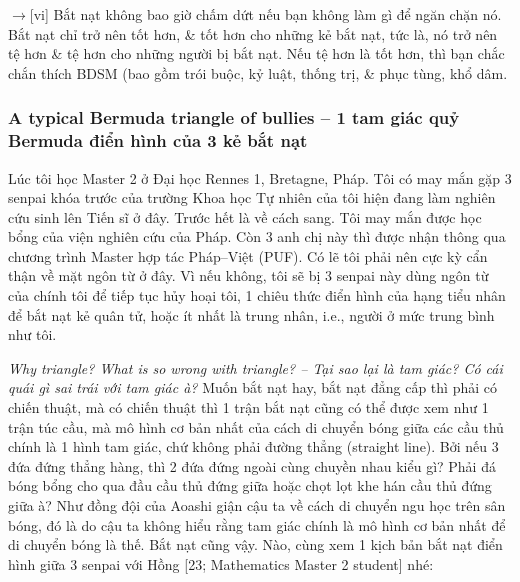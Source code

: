 \documentclass[12pt,twoside]{book}
\begin{document}
{\sf[en]$\to$[vi]} Bắt nạt không bao giờ chấm dứt nếu bạn không làm gì để ngăn chặn nó. Bắt nạt chỉ trở nên tốt hơn, \& tốt hơn cho những kẻ bắt nạt, tức là, nó trở nên tệ hơn \& tệ hơn cho những người bị bắt nạt. Nếu tệ hơn là tốt hơn, thì bạn chắc chắn thích BDSM (bao gồm trói buộc, kỷ luật, thống trị, \& phục tùng, khổ dâm.

\subsubsection{A typical Bermuda triangle of bullies -- 1 tam giác quỷ Bermuda điển hình của 3 kẻ bắt nạt}
Lúc tôi học Master 2 ở Đại học Rennes 1, Bretagne, Pháp. Tôi có may mắn gặp 3 senpai khóa trước của trường Khoa học Tự nhiên của tôi hiện đang làm nghiên cứu sinh lên Tiến sĩ ở đây. Trước hết là về cách sang. Tôi may mắn được học bổng của viện nghiên cứu của Pháp. Còn 3 anh chị này thì được nhận thông qua chương trình Master hợp tác Pháp--Việt (PUF). Có lẽ tôi phải nên cực kỳ cẩn thận về mặt ngôn từ ở đây. Vì nếu không, tôi sẽ bị 3 senpai này dùng ngôn từ của chính tôi để tiếp tục hủy hoại tôi, 1 chiêu thức điển hình của hạng tiểu nhân để bắt nạt kẻ quân tử, hoặc ít nhất là trung nhân, i.e., người ở mức trung bình như tôi.

{\it Why triangle? What is so wrong with triangle? -- Tại sao lại là tam giác? Có cái quái gì sai trái với tam giác à?} Muốn bắt nạt hay, bắt nạt đẳng cấp thì phải có chiến thuật, mà có chiến thuật thì 1 trận bắt nạt cũng có thể được xem như 1 trận túc cầu, mà mô hình cơ bản nhất của cách di chuyển bóng giữa các cầu thủ chính là 1 hình tam giác, chứ không phải đường thẳng (straight line). Bởi nếu 3 đứa đứng thẳng hàng, thì 2 đứa đứng ngoài cùng chuyền nhau kiểu gì? Phải đá bóng bổng cho qua đầu cầu thủ đứng giữa hoặc chọt lọt khe hán cầu thủ đứng giữa à? Như đồng đội của {\sf Aoashi} giận cậu ta về cách di chuyển ngu học trên sân bóng, đó là do cậu ta không hiểu rằng tam giác chính là mô hình cơ bản nhất để di chuyển bóng là thế. Bắt nạt cũng vậy. Nào, cùng xem 1 kịch bản bắt nạt điển hình giữa 3 senpai với {\sf Hồng [23; Mathematics Master 2 student]} nhé:
\end{document}
